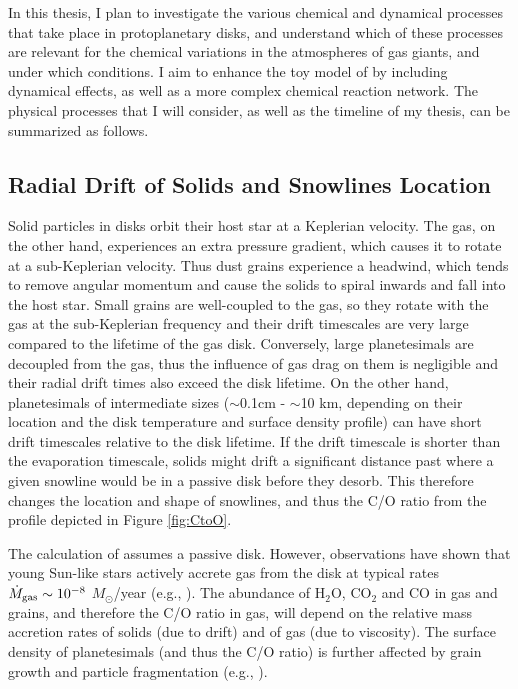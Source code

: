 \documentclass[manuscript]{aastex}
\begin{document}
In this thesis, I plan to investigate the various chemical and dynamical processes that take place in protoplanetary disks, and understand which of these processes are relevant for the chemical variations in the atmospheres of gas giants, and under which conditions. I aim to enhance the toy model of \citet{oberg11} by including dynamical effects, as well as a more complex chemical reaction network. The physical processes that I will consider, as well as the timeline of my thesis, can be summarized as follows. 

\subsection{Radial Drift of Solids and Snowlines Location}
\label{sec:drift}

Solid particles in disks orbit their host star at a Keplerian velocity. The gas, on the other hand, experiences an extra pressure gradient, which causes it to rotate at a sub-Keplerian velocity. Thus dust grains experience a headwind, which tends to remove angular momentum and cause the solids to spiral inwards and fall into the host star. Small grains are well-coupled to the gas, so they rotate with the gas at the sub-Keplerian frequency and their drift timescales are very large compared to the lifetime of the gas disk. Conversely, large planetesimals are decoupled from the gas, thus the influence of gas drag on them is negligible and their radial drift times also exceed the disk lifetime. On the other hand, planetesimals of intermediate sizes ($\sim$0.1cm - $\sim$10 km, depending on their location and the disk temperature and surface density profile) can have short drift timescales relative to the disk lifetime. If  the drift timescale is shorter than the evaporation timescale, solids might drift a significant distance past where a given snowline would be in a passive disk before they desorb. This therefore changes the location and shape of snowlines, and thus the C/O ratio from the profile depicted in Figure \ref{fig:CtoO}.

The calculation of \citet{oberg11} assumes a passive disk. However, observations have shown that young Sun-like stars actively accrete gas from the disk at typical rates $\dot{M}_{\rm gas} \sim 10^{-8}$ $M_{\odot}$/year (e.g., \citealt{hartmann06}). The abundance of H$_2$O, CO$_2$ and CO in gas and grains, and therefore the C/O ratio in gas, will depend on the relative mass accretion rates of solids (due to drift) and of gas (due to viscosity). The surface density of planetesimals (and thus the C/O ratio) is further affected by grain growth and particle fragmentation (e.g., \citealt{birnstiel12}).
\end{document}
